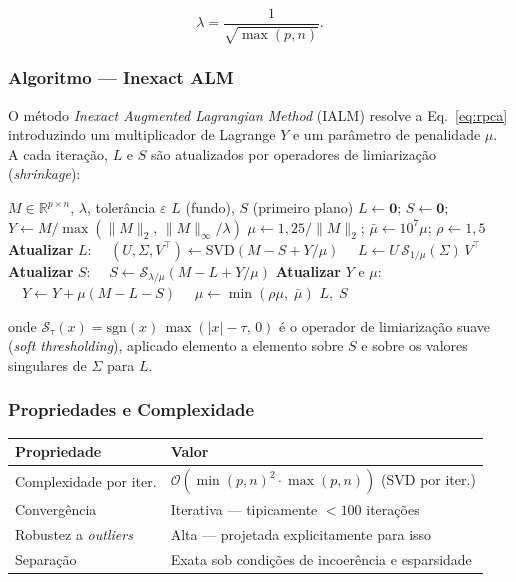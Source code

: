\documentclass[12pt, a4paper]{article}
\begin{document}
\begin{equation}
  \lambda = \frac{1}{\sqrt{\max(p,n)}}.
  \label{eq:lambda}
\end{equation}

\subsubsection{Algoritmo — Inexact ALM}

O método \emph{Inexact Augmented Lagrangian Method} (IALM) resolve a
Eq.~\eqref{eq:rpca} introduzindo um multiplicador de Lagrange $Y$ e um
parâmetro de penalidade $\mu$. A cada iteração, $L$ e $S$ são atualizados por
operadores de limiarização (\emph{shrinkage}):

\begin{algorithm}[H]
\caption{Robust PCA via Inexact ALM}
\label{alg:rpca}
\begin{algorithmic}[1]
  \Require $M \in \mathbb{R}^{p \times n}$, $\lambda$, tolerância $\varepsilon$
  \Ensure $L$ (fundo), $S$ (primeiro plano)
  \State $L \leftarrow \mathbf{0}$;\; $S \leftarrow \mathbf{0}$;\;
         $Y \leftarrow M / \max(\|M\|_2,\, \|M\|_\infty / \lambda)$
  \State $\mu \leftarrow 1{,}25 / \|M\|_2$;\;
         $\bar{\mu} \leftarrow 10^7 \mu$;\; $\rho \leftarrow 1{,}5$
  \Repeat
    \State \textbf{Atualizar} $L$:
    $\quad (U,\Sigma,V^\top) \leftarrow \mathrm{SVD}(M - S + Y/\mu)$
    $\quad L \leftarrow U\,\mathcal{S}_{1/\mu}(\Sigma)\,V^\top$
    \State \textbf{Atualizar} $S$:
    $\quad S \leftarrow \mathcal{S}_{\lambda/\mu}(M - L + Y/\mu)$
    \State \textbf{Atualizar} $Y$ e $\mu$:
    $\quad Y \leftarrow Y + \mu(M - L - S)$
    $\quad \mu \leftarrow \min(\rho\mu,\;\bar{\mu})$
  \Return $L,\; S$
\end{algorithmic}
\end{algorithm}

onde $\mathcal{S}_\tau(x) = \mathrm{sgn}(x)\,\max(|x|-\tau,\,0)$ é o operador
de limiarização suave (\emph{soft thresholding}), aplicado elemento a elemento
sobre $S$ e sobre os valores singulares de $\Sigma$ para $L$.

\subsubsection{Propriedades e Complexidade}

\begin{tabular}{ll}
  \toprule
  Propriedade            & Valor \\
  \midrule
  Complexidade por iter. & $\mathcal{O}(\min(p,n)^2 \cdot \max(p,n))$ (SVD por iter.) \\
  Convergência           & Iterativa — tipicamente $< 100$ iterações \\
  Robustez a \emph{outliers} & Alta — projetada explicitamente para isso \\
  Separação              & Exata sob condições de incoerência e esparsidade \\
  \bottomrule
\end{tabular}
\end{document}
